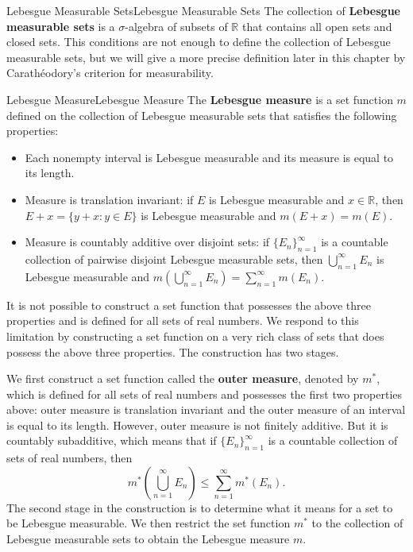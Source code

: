 \documentclass[../main.tex]{subfiles}
\begin{document}
\begin{definition}{Lebesgue Measurable Sets}{Lebesgue Measurable Sets}
  The collection of \textbf{Lebesgue measurable sets} is a $\sigma$-algebra of subsets of $\mathbb{R}$ that contains all open sets and closed sets. This conditions are not enough to define the collection of Lebesgue measurable sets, but we will give a more precise definition later in this chapter by Carath\'eodory's criterion for measurability.
\end{definition}

\begin{definition}{Lebesgue Measure}{Lebesgue Measure}
  The \textbf{Lebesgue measure} is a set function $m$ defined on the collection of Lebesgue measurable sets that satisfies the following properties:
  \begin{itemize}
    \item Each nonempty interval is Lebesgue measurable and its measure is equal to its length.
    \item Measure is translation invariant: if $E$ is Lebesgue measurable and $x \in \mathbb{R}$, then $E + x = \{y + x : y \in E\}$ is Lebesgue measurable and $m(E + x) = m(E)$.
    \item Measure is countably additive over disjoint sets: if $\{E_n\}_{n=1}^{\infty}$ is a countable collection of pairwise disjoint Lebesgue measurable sets, then $\bigcup_{n=1}^{\infty} E_n$ is Lebesgue measurable and $m\left(\bigcup_{n=1}^{\infty} E_n\right) = \sum_{n=1}^{\infty} m(E_n)$.
  \end{itemize}
\end{definition}

It is not possible to construct a set function that possesses the above three properties and is defined for all sets of real numbers. We respond to this limitation by constructing a set function on a very rich class of sets that does possess the above three properties. The construction has two stages.

We first construct a set function called the \textbf{outer measure}, denoted by $m^*$, which is defined for all sets of real numbers and possesses the first two properties above: outer measure is translation invariant and the outer measure of an interval is equal to its length. However, outer measure is not finitely additive. But it is countably subadditive, which means that if $\{E_n\}_{n=1}^{\infty}$ is a countable collection of sets of real numbers, then
\begin{equation}
  m^*\left(\bigcup_{n=1}^{\infty} E_n\right) \leq \sum_{n=1}^{\infty} m^*(E_n).
\end{equation}
The second stage in the construction is to determine what it means for a set to be Lebesgue measurable. We then restrict the set function $m^*$ to the collection of Lebesgue measurable sets to obtain the Lebesgue measure $m$.
\end{document}

